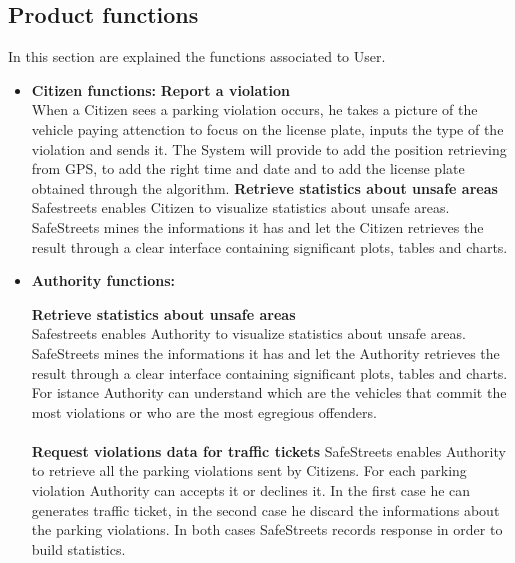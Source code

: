 \documentclass{article}
\begin{document}
\subsection{Product functions}
In this section are explained the functions associated to User.
\begin{itemize}
 \item \textbf{Citizen functions:}
 \textbf{Report a violation}
 \\When a Citizen sees a parking violation occurs, he takes a picture of the vehicle paying attenction to focus on the 
 license plate, inputs the type of the violation and sends it. The System will provide to add the position retrieving 
 from GPS, to add the right time and date and to add the license plate obtained through the algorithm. 
\textbf{Retrieve statistics about unsafe areas}
\\Safestreets enables Citizen to visualize statistics about unsafe areas. SafeStreets mines the informations it has and let 
the Citizen retrieves the result through a clear interface containing significant plots, tables and charts. 

\item \textbf{Authority functions:}

 
\textbf{Retrieve statistics about unsafe areas}
\\Safestreets enables Authority to visualize statistics about unsafe areas. SafeStreets mines the informations it has and let 
the Authority retrieves the result through a clear interface containing significant plots, tables and charts. For istance 
Authority can understand which are the vehicles that commit the most violations or who are the most egregious offenders.
\\
\\
\textbf{Request violations data for traffic tickets}
SafeStreets enables Authority to retrieve all the parking violations sent by Citizens. For each parking violation Authority can
accepts it or declines it. In the first case he can generates traffic ticket, in the second case he discard the informations about
the parking violations. In both cases SafeStreets records response in order to build statistics.

\end{itemize}
\end{document}
